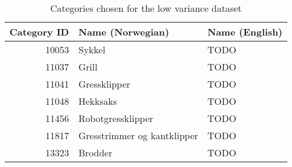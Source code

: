 \begin{table}[h]
\centering
\caption{Categories chosen for the low variance dataset}
\label{table:dataset-low_variance_categories}
\begin{tabular}{rll}
\toprule
 Category ID &            Name (Norwegian) & Name (English) \\
\midrule
       10053 &                      Sykkel &           TODO \\
       11037 &                       Grill &           TODO \\
       11041 &                Gressklipper &           TODO \\
       11048 &                    Hekksaks &           TODO \\
       11456 &           Robotgressklipper &           TODO \\
       11817 & Gresstrimmer og kantklipper &           TODO \\
       13323 &                     Brodder &           TODO \\
\bottomrule
\end{tabular}
\end{table}
